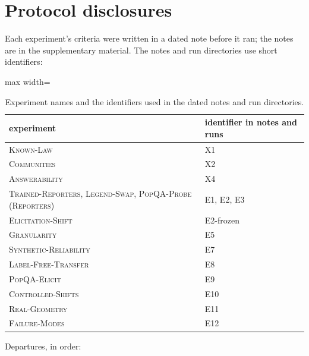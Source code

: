 \documentclass[twoside]{article}
\theoremstyle{definition}
\theoremstyle{remark}
\newcommand{\1}{\mathbf{1}}
\newcommand{\expname}[1]{\textsc{#1}}
\begin{document}
\section{Protocol disclosures}
\label{app:protocol}
Each experiment's criteria were written in a dated note before it ran; the notes are in the
supplementary material. The notes and run directories use short identifiers:
\begin{table}[t]
\caption{Experiment names and the identifiers used in the dated notes and run directories.}
\centering\small
\begin{adjustbox}{max width=\textwidth}
\begin{tabular}{ll}
\toprule
experiment & identifier in notes and runs\\
\midrule
\expname{Known-Law} & X1\\
\expname{Communities} & X2\\
\expname{Answerability} & X4\\
\expname{Trained-Reporters}, \expname{Legend-Swap}, \expname{PopQA-Probe} (\expname{Reporters}) & E1, E2, E3\\
\expname{Elicitation-Shift} & E2-frozen\\
\expname{Granularity} & E5\\
\expname{Synthetic-Reliability} & E7\\
\expname{Label-Free-Transfer} & E8\\
\expname{PopQA-Elicit} & E9\\
\expname{Controlled-Shifts} & E10\\
\expname{Real-Geometry} & E11\\
\expname{Failure-Modes} & E12\\
\bottomrule
\end{tabular}
\end{adjustbox}
\end{table} Departures, in order:
\end{document}
